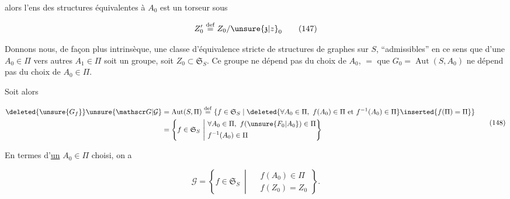 
alors l'ens des structures  équivalentes à $A_0$ est un torseur sous 

\[
 Z'_0\overset{\mathrm{def}}{=}Z_0/\unsure{\mathfrak z|z}_0
 \tag*{(147)}
\]

Donnons nous, de façon plus intrinsèque, une classe d'équivalence stricte \inserted{$\Pi$} de structures de graphes sur $S$, ``admissibles'' en ce sens que   d'une  $A_0\in\Pi$ vers  autres  $A_1\in\Pi$ soit un groupe, soit $Z_0\subset\mathfrak S_S$. Ce groupe ne dépend pas du choix de $A_0$,  $=$ que $G_0=\operatorname{Aut}(S,A_0)$ ne dépend pas du choix de $A_0\in\Pi$.



Soit alors

\[
 \begin{aligned}
 \deleted{\unsure{G_f}}\unsure{\mathscr G|\mathcal G}&=\operatorname{Aut}(S,\Pi)
 \overset{\mathrm{def}}{=}
 \{f\in\mathfrak S_S\mid
 \deleted{\forall A_0\in\Pi,\ f(A_0)\in\Pi\text{ et }f^{-1}(A_0)\in\Pi}
 \inserted{f(\Pi)=\Pi}\}\\
 &=\left\{f\in\mathfrak S_S\ \middle|\ 
 \begin{aligned}
 &\forall A_0\in\Pi,\ f(\unsure{F_0|A_0})\in\Pi\\
 & f^{-1}(A_0)\in\Pi
 \end{aligned}\right\}
 \end{aligned}
 \tag*{(148)}
\]

En termes d'\uline{un} $A_0\in\Pi$ choisi, on a

\[
 \mathscr G=\left\{f\in\mathfrak S_S\ \middle|\
 \begin{aligned} &f(A_0)\in\Pi\\ &f(Z_0)=Z_0\end{aligned}\right\}.
 \tag*{(149)}
\]


